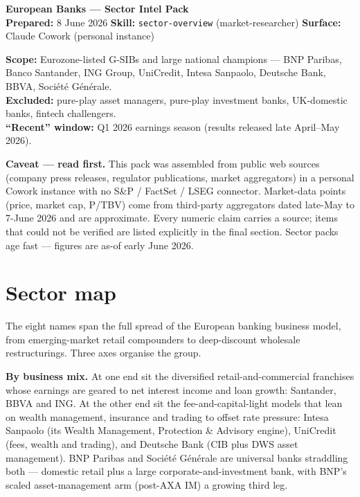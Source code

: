 \documentclass[10pt,a4paper]{article}
\begin{document}
\noindent
\begin{tcolorbox}[colback=darkgray, colframe=darkgray, arc=2pt, boxrule=0pt]
  \color{white}\textbf{\Large European Banks --- Sector Intel Pack}\\[2pt]
  \small \textbf{Prepared:} 8 June 2026 \quad \textbar\quad \textbf{Skill:} \texttt{sector-overview} (market-researcher) \quad \textbar\quad \textbf{Surface:} Claude Cowork (personal instance)
\end{tcolorbox}

\textbf{Scope:} Eurozone-listed G-SIBs and large national champions --- BNP Paribas, Banco Santander, ING Group, UniCredit, Intesa Sanpaolo, Deutsche Bank, BBVA, Soci\'et\'e G\'en\'erale.\\
\textbf{Excluded:} pure-play asset managers, pure-play investment banks, UK-domestic banks, fintech challengers.\\
\textbf{``Recent'' window:} Q1 2026 earnings season (results released late April--May 2026).

\begin{tcolorbox}[colback=lightgray, colframe=accentpurple, boxrule=1pt, leftrule=3pt, arc=2pt]
\textbf{Caveat --- read first.} This pack was assembled from public web sources (company press releases, regulator publications, market aggregators) in a personal Cowork instance with no S\&P / FactSet / LSEG connector. Market-data points (price, market cap, P/TBV) come from third-party aggregators dated late-May to 7-June 2026 and are approximate. Every numeric claim carries a source; items that could not be verified are listed explicitly in the final section. Sector packs age fast --- figures are as-of early June 2026.
\end{tcolorbox}

\section{Sector map}

The eight names span the full spread of the European banking business model, from emerging-market retail compounders to deep-discount wholesale restructurings. Three axes organise the group.

\textbf{By business mix.} At one end sit the diversified retail-and-commercial franchises whose earnings are geared to net interest income and loan growth: Santander, BBVA and ING. At the other end sit the fee-and-capital-light models that lean on wealth management, insurance and trading to offset rate pressure: Intesa Sanpaolo (its Wealth Management, Protection \& Advisory engine), UniCredit (fees, wealth and trading), and Deutsche Bank (CIB plus DWS asset management). BNP Paribas and Soci\'et\'e G\'en\'erale are universal banks straddling both --- domestic retail plus a large corporate-and-investment bank, with BNP's scaled asset-management arm (post-AXA IM) a growing third leg.
\end{document}
